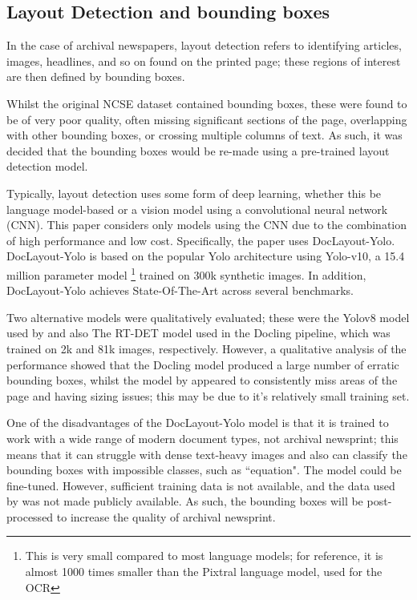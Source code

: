 \documentclass{article} %
\begin{document}
\FloatBarrier
\subsection{Layout Detection and bounding boxes}

In the case of archival newspapers, layout detection refers to identifying articles, images, headlines, and so on found on the printed page; these regions of interest are then defined by bounding boxes.

Whilst the original NCSE dataset contained bounding boxes, these were found to be of very poor quality, often missing significant sections of the page, overlapping with other bounding boxes, or crossing multiple columns of text. As such, it was decided that the bounding boxes would be re-made using a pre-trained layout detection model.

Typically, layout detection uses some form of deep learning, whether this be language model-based \cite{huang_layoutlmv3_2022, shehzadi_bridging_2023} or a vision model using a convolutional neural network (CNN). This paper considers only models using the CNN due to the combination of high performance and low cost. Specifically, the paper uses DocLayout-Yolo. DocLayout-Yolo is based on the popular Yolo architecture using Yolo-v10, a 15.4 million parameter model \footnote{This is very small compared to most language models; for reference, it is almost 1000 times smaller than the Pixtral language model, used for the OCR} trained on 300k synthetic images. In addition, DocLayout-Yolo achieves State-Of-The-Art across several benchmarks.

Two alternative models were qualitatively evaluated; these were the Yolov8 model used by \cite{dell_american_2024} and also The RT-DET model used in the Docling pipeline, which was trained on 2k and 81k images, respectively. However, a qualitative analysis of the performance showed that the Docling model produced a large number of erratic bounding boxes, whilst the model by \cite{dell_american_2024} appeared to consistently miss areas of the page and having sizing issues; this may be due to it's relatively small training set.

One of the disadvantages of the DocLayout-Yolo model is that it is trained to work with a wide range of modern document types, not archival newsprint; this means that it can struggle with dense text-heavy images and also can classify the bounding boxes with impossible classes, such as ``equation". The model could be fine-tuned. However, sufficient training data is not available, and the data used by \cite{dell_american_2024} was not made publicly available. As such, the bounding boxes will be post-processed to increase the quality of archival newsprint.
\end{document}
